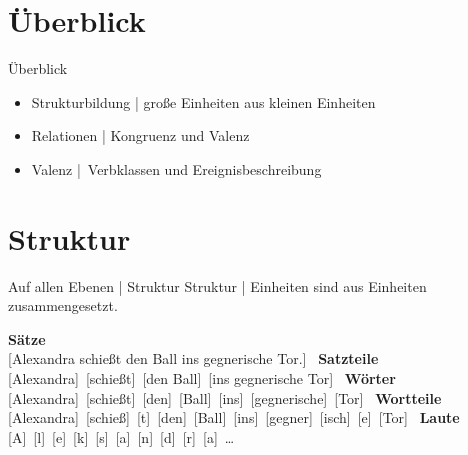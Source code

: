\section{Überblick}

\begin{frame}
  {Überblick}
  \onslide<+->
  \onslide<+->
  \begin{itemize}[<+->]
    \item \alert{Strukturbildung} | große Einheiten aus kleinen Einheiten
    \Zeile
    \item \alert{Relationen} | Kongruenz und Valenz
    \Zeile
    \item \alert{Valenz} | Verbklassen und Ereignisbeschreibung
  \end{itemize}
\end{frame}

\section{Struktur}

\begin{frame}
  {Auf allen Ebenen | Struktur}
  \onslide<+->
  \onslide<+->
  \alert{Struktur} | Einheiten sind aus Einheiten zusammengesetzt.
  \begin{exe}
    \ex\label{ex:strukturbildung021}
    \begin{xlist}
      \ex \textbf{Sätze} \\
      {\alert{[}Alexandra schießt den Ball ins gegnerische Tor.\alert{]}\ }
      \onslide<+->
      \ex \textbf{Satzteile} \\
      {\alert{[}Alexandra\alert{]}\  \alert{[}schießt\alert{]}\  \alert{[}den Ball\alert{]}\  \alert{[}ins gegnerische Tor\alert{]}\ }
      \onslide<+->
      \ex \textbf{Wörter} \\
      {\alert{[}Alexandra\alert{]}\  \alert{[}schießt\alert{]}\  \alert{[}den\alert{]}\  \alert{[}Ball\alert{]}\  \alert{[}ins\alert{]}\  \alert{[}gegnerische\alert{]}\  \alert{[}Tor\alert{]}\ }
      \onslide<+->
      \ex \textbf{Wortteile} \\
      {\alert{[}Alexandra\alert{]}\  \alert{[}schieß\alert{]}\ \alert{[}t\alert{]}\  \alert{[}den\alert{]}\  \alert{[}Ball\alert{]}\  \alert{[}ins\alert{]}\  \alert{[}gegner\alert{]}\ \alert{[}isch\alert{]}\ \alert{[}e\alert{]}\  \alert{[}Tor\alert{]}\ }
      \onslide<+-> 
      \ex \textbf{Laute} \\
      {\alert{[}A\alert{]}\ \alert{[}l\alert{]}\ \alert{[}e\alert{]}\ \alert{[}k\alert{]}\ \alert{[}s\alert{]}\ \alert{[}a\alert{]}\ \alert{[}n\alert{]}\ \alert{[}d\alert{]}\ \alert{[}r\alert{]}\ \alert{[}a\alert{]}\  \ldots \\}
    \end{xlist}
  \end{exe}
\end{frame}


